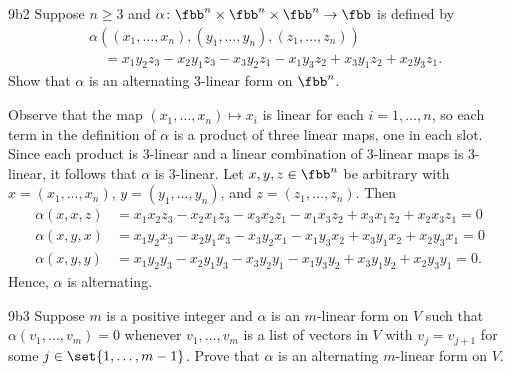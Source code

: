 \begin{exercise}{9b2}
    Suppose $n \geq 3$ and $\alpha \colon \fbb^n \times \fbb^n \times \fbb^n \to \fbb$ is defined by
    \begin{align*}
        &\alpha((x_1, \ldots, x_n), (y_1, \ldots, y_n), (z_1, \ldots, z_n)) \\
        &\quad = x_1 y_2 z_3 - x_2 y_1 z_3 - x_3 y_2 z_1 - x_1 y_3 z_2 + x_3 y_1 z_2 + x_2 y_3 z_1.
    \end{align*}
    Show that $\alpha$ is an alternating $3$-linear form on $\fbb^n$.
\end{exercise}

\begin{sol}
    Observe that the map $(x_1, \ldots, x_n) \mapsto x_i$ is linear for each $i = 1, \ldots, n$, so each term in the definition of $\alpha$ is a product of three linear maps, one in each slot.
    Since each product is $3$-linear and a linear combination of $3$-linear maps is $3$-linear, it follows that $\alpha$ is $3$-linear.
    Let $x, y, z \in \fbb^n$ be arbitrary with $x = (x_1, \ldots, x_n)$, $y = (y_1, \ldots, y_n)$, and $z = (z_1, \ldots, z_n)$.
    Then
    \begin{align*}
        \alpha(x, x, z) &= x_1 x_2 z_3 - x_2 x_1 z_3 - x_3 x_2 z_1 - x_1 x_3 z_2 + x_3 x_1 z_2 + x_2 x_3 z_1 = 0 \\
        \alpha(x, y, x) &= x_1 y_2 x_3 - x_2 y_1 x_3 - x_3 y_2 x_1 - x_1 y_3 x_2 + x_3 y_1 x_2 + x_2 y_3 x_1 = 0 \\
        \alpha(x, y, y) &= x_1 y_2 y_3 - x_2 y_1 y_3 - x_3 y_2 y_1 - x_1 y_3 y_2 + x_3 y_1 y_2 + x_2 y_3 y_1 = 0.
    \end{align*}
    Hence, $\alpha$ is alternating.
\end{sol}

\begin{exercise}{9b3}
    Suppose $m$ is a positive integer and $\alpha$ is an $m$-linear form on $V$ such that $\alpha(v_1, \ldots, v_m) = 0$ whenever $v_1, \ldots, v_m$ is a list of vectors in $V$ with $v_j = v_{j+1}$ for some $j \in \set{1, \ldots, m - 1}$.
    Prove that $\alpha$ is an alternating $m$-linear form on $V$.
\end{exercise}

